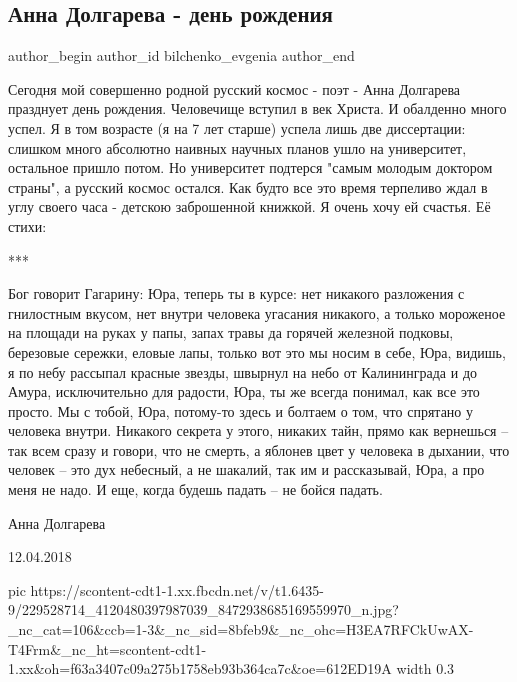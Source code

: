  
 
 
 
 
 
\subsection{Анна Долгарева - день рождения}
\label{sec:04_08_2021.fb.bilchenko_evgenia.1.dolgareva_birthday}
 
\ifcmt
 author_begin
   author_id bilchenko_evgenia
 author_end
\fi

Сегодня мой совершенно родной русский космос - поэт - Анна Долгарева  празднует
день рождения. Человечище вступил в век Христа. И обалденно много успел. Я в
том возрасте (я на 7 лет старше) успела лишь две диссертации: слишком много
абсолютно наивных научных планов ушло на университет, остальное пришло потом.
Но университет подтерся "самым молодым доктором страны", а русский космос
остался. Как будто все это время терпеливо ждал в углу своего часа - детскою
заброшенной книжкой. Я очень хочу ей счастья. Её стихи:

***
\begin{multicols}{2}
\obeycr
Бог говорит Гагарину: Юра, теперь ты в курсе: 
нет никакого разложения с гнилостным вкусом, 
нет внутри человека угасания никакого, 
а только мороженое на площади на руках у папы, 
\smallskip
запах травы да горячей железной подковы, 
березовые сережки, еловые лапы, 
только вот это мы носим в себе, Юра, 
видишь, я по небу рассыпал красные звезды, 
\smallskip
швырнул на небо от Калининграда и до Амура, 
исключительно для радости, Юра, 
ты же всегда понимал, как все это просто. 
\smallskip
Мы с тобой, Юра, потому-то здесь и болтаем 
о том, что спрятано у человека внутри. 
Никакого секрета у этого, никаких тайн, 
прямо как вернешься – так всем сразу и говори, 
\smallskip
что не смерть, а яблонев цвет у человека в дыхании, 
что человек – это дух небесный, а не шакалий, 
так им и рассказывай, Юра, а про меня не надо. 
\smallskip
И еще, когда будешь падать – 
не бойся падать. 
\restorecr
\end{multicols}

Анна Долгарева

12.04.2018

\ifcmt
  pic https://scontent-cdt1-1.xx.fbcdn.net/v/t1.6435-9/229528714_4120480397987039_8472938685169559970_n.jpg?_nc_cat=106&ccb=1-3&_nc_sid=8bfeb9&_nc_ohc=H3EA7RFCkUwAX-T4Frm&_nc_ht=scontent-cdt1-1.xx&oh=f63a3407c09a275b1758eb93b364ca7c&oe=612ED19A
  width 0.3
\fi


